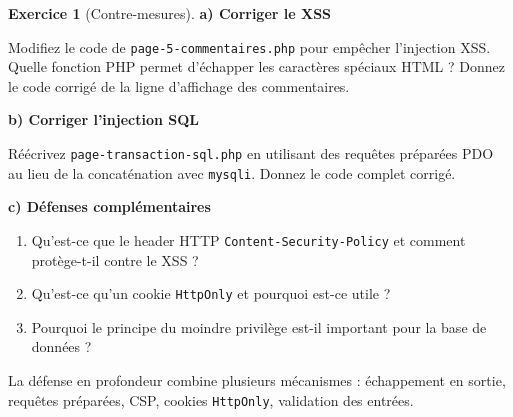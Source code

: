 \documentclass[a4paper,11pt]{article}
\theoremstyle{plain}
\theoremstyle{definition}
\newtheorem{exercice}{Exercice}
\begin{document}
\begin{exercice}[Contre-mesures]

\textbf{a) Corriger le XSS}

\medskip

Modifiez le code de \texttt{page-5-commentaires.php} pour empêcher l'injection XSS. Quelle fonction PHP permet d'échapper les caractères spéciaux HTML ? Donnez le code corrigé de la ligne d'affichage des commentaires.

\medskip

\textbf{b) Corriger l'injection SQL}

\medskip

Réécrivez \texttt{page-transaction-sql.php} en utilisant des requêtes préparées PDO au lieu de la concaténation avec \texttt{mysqli}. Donnez le code complet corrigé.

\medskip

\textbf{c) Défenses complémentaires}

\begin{enumerate}
    \item Qu'est-ce que le header HTTP \texttt{Content-Security-Policy} et comment protège-t-il contre le XSS ?
    \item Qu'est-ce qu'un cookie \texttt{HttpOnly} et pourquoi est-ce utile ?
    \item Pourquoi le principe du moindre privilège est-il important pour la base de données ?
\end{enumerate}

\begin{pointcle}
La défense en profondeur combine plusieurs mécanismes : échappement en sortie, requêtes préparées, CSP, cookies \texttt{HttpOnly}, validation des entrées.
\end{pointcle}

\end{exercice}
\end{document}
